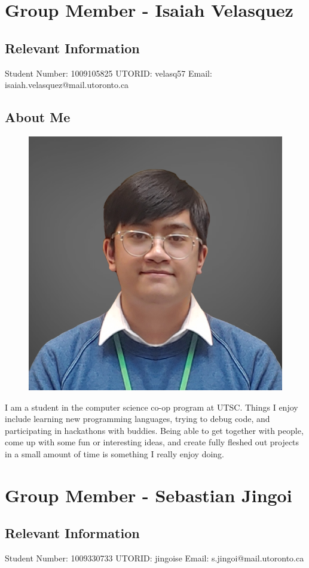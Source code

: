 \documentclass{article}
\begin{document}
\section{Group Member - Isaiah Velasquez}
\subsection{Relevant Information}
    Student Number: 1009105825 \newline
    UTORID: velasq57 \newline
    Email: isaiah.velasquez@mail.utoronto.ca
\subsection{About Me}
\begin{figure}[h]
    \centering
    \includegraphics[width=0.25\linewidth]{images/IsaiahPhoto.png}
\end{figure}
I am a student in the computer science co-op program at UTSC. Things I enjoy include learning new programming languages, trying to debug code, and participating in hackathons with buddies. Being able to get together with people, come up with some fun or interesting ideas, and create fully fleshed out projects in a small amount of time is something I really enjoy doing. 

\noindent\makebox[\linewidth]{\rule{\paperwidth}{0.4pt}}

\section{Group Member - Sebastian Jingoi}
\subsection{Relevant Information}
    Student Number: 1009330733 \newline
    UTORID: jingoise \newline
    Email: s.jingoi@mail.utoronto.ca
\end{document}
